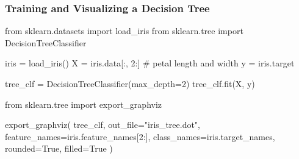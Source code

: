 \documentclass[
  letterpaper,
  DIV=11,
  numbers=noendperiod]{scrartcl}
\newenvironment{Shaded}{\begin{snugshade}}{\end{snugshade}}
\newcommand{\CommentTok}[1]{\textcolor[rgb]{0.37,0.37,0.37}{#1}}
\newcommand{\DecValTok}[1]{\textcolor[rgb]{0.68,0.00,0.00}{#1}}
\newcommand{\ImportTok}[1]{\textcolor[rgb]{0.00,0.46,0.62}{#1}}
\newcommand{\NormalTok}[1]{\textcolor[rgb]{0.00,0.23,0.31}{#1}}
\newcommand{\OperatorTok}[1]{\textcolor[rgb]{0.37,0.37,0.37}{#1}}
\newcommand{\StringTok}[1]{\textcolor[rgb]{0.13,0.47,0.30}{#1}}
\newcommand{\VariableTok}[1]{\textcolor[rgb]{0.07,0.07,0.07}{#1}}
\begin{document}
\subsubsection{Training and Visualizing a Decision
Tree}\label{training-and-visualizing-a-decision-tree}

\begin{Shaded}
\begin{Highlighting}[]
\ImportTok{from}\NormalTok{ sklearn.datasets }\ImportTok{import}\NormalTok{ load\_iris}
\ImportTok{from}\NormalTok{ sklearn.tree }\ImportTok{import}\NormalTok{ DecisionTreeClassifier}

\NormalTok{iris }\OperatorTok{=}\NormalTok{ load\_iris()}
\NormalTok{X }\OperatorTok{=}\NormalTok{ iris.data[:, }\DecValTok{2}\NormalTok{:] }\CommentTok{\# petal length and width}
\NormalTok{y }\OperatorTok{=}\NormalTok{ iris.target}

\NormalTok{tree\_clf }\OperatorTok{=}\NormalTok{ DecisionTreeClassifier(max\_depth}\OperatorTok{=}\DecValTok{2}\NormalTok{)}
\NormalTok{tree\_clf.fit(X, y)}
\end{Highlighting}
\end{Shaded}

\begin{Shaded}
\begin{Highlighting}[]
\ImportTok{from}\NormalTok{ sklearn.tree }\ImportTok{import}\NormalTok{ export\_graphviz}

\NormalTok{export\_graphviz(}
\NormalTok{        tree\_clf,}
\NormalTok{        out\_file}\OperatorTok{=}\StringTok{"iris\_tree.dot"}\NormalTok{,}
\NormalTok{        feature\_names}\OperatorTok{=}\NormalTok{iris.feature\_names[}\DecValTok{2}\NormalTok{:],}
\NormalTok{        class\_names}\OperatorTok{=}\NormalTok{iris.target\_names,}
\NormalTok{        rounded}\OperatorTok{=}\VariableTok{True}\NormalTok{,}
\NormalTok{        filled}\OperatorTok{=}\VariableTok{True}
\NormalTok{    )}
\end{Highlighting}
\end{Shaded}
\end{document}
